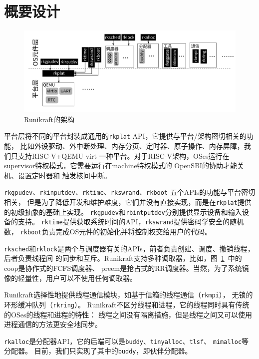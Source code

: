 \documentclass{../runikraft-report}
\begin{document}
\section{概要设计}
\begin{figure}[!hbt]
\centering
\includegraphics[width=\linewidth]{assets/Runikraft-architecture-impl.pdf}
\caption{Runikraft的架构}\label{fig:runikraft-arch-impl}
\end{figure}
平台层将不同的平台封装成通用的\texttt{rkplat} API，它提供与平台/架构密切相关的功能，
比如外设驱动、外中断处理、内存分页、定时器、原子操作、内存屏障，我们只支持RISC-V+QEMU virt
一种平台。对于RISC-V架构，OSes运行在supervisor特权模式，它需要运行在machine特权模式的
OpenSBI\cite{bib:feasibility-5}\cite{bib:feasibility-6}的协助才能关机、设置定时器和
触发核间中断。

\texttt{rkgpudev}、\texttt{rkinputdev}、\texttt{rktime}、\texttt{rkswrand}、\texttt{rkboot}
五个APIs的功能与平台密切相关，
但是为了降低开发和维护难度，它们并没有直接实现，而是在\texttt{rkplat}提供的初级抽象的基础上实现。
\texttt{rkgpudev}和\texttt{rbintputdev}分别提供显示设备和输入设备的支持。
\texttt{rktime}提供获取系统时间的API，\texttt{rkswrand}提供密码学安全的随机数，
\texttt{rkboot}负责完成OS元件的初始化并将控制权交给用户的代码。

\texttt{rksched}和\texttt{rklock}是两个与调度器有关的APIs，前者负责创建、调度、撤销线程，后者负责线程间
的同步和互斥。Runikraft支持多种调取器，比如，图\ \ref{fig:runikraft-arch-impl}\ 中的
coop是协作式的FCFS调度器、
preem是抢占式的RR调度器。当然，为了系统镜像的轻量性，用户可以不使用任何调取器。

Runikraft选择性地提供线程通信模块，如基于信箱的线程通信（\texttt{rkmpi}），
无锁的环形缓冲队列（\texttt{rkring}）。
Runikraft不区分线程和进程，它的线程同时具有传统的OSes的线程和进程的特性：
线程之间没有隔离措施，但是线程之间又可以使用进程通信的方法更安全地同步。

\texttt{rkalloc}是分配器API，它的后端可以是\texttt{buddy}、\texttt{tinyalloc}、\texttt{tlsf}、
\texttt{mimalloc}等分配器。
目前，我们只实现了其中的\texttt{buddy}，即伙伴分配器。
\end{document}
